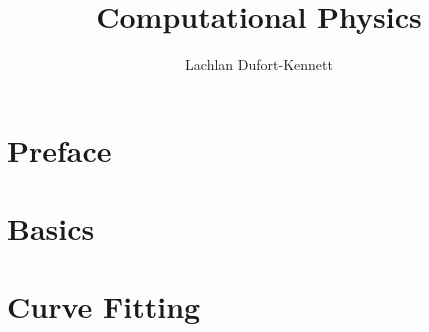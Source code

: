 \documentclass{lecture-notes}
\title{Computational Physics}
\author{Lachlan Dufort-Kennett}
\begin{document}
    \frontmatter
    \maketitle
    \tableofcontents

    \chapter{Preface}

    \mainmatter
    \chapter{Basics}
    
    \chapter{Curve Fitting}
    

    \backmatter
    \nocite{*}
    
    
\end{document}
